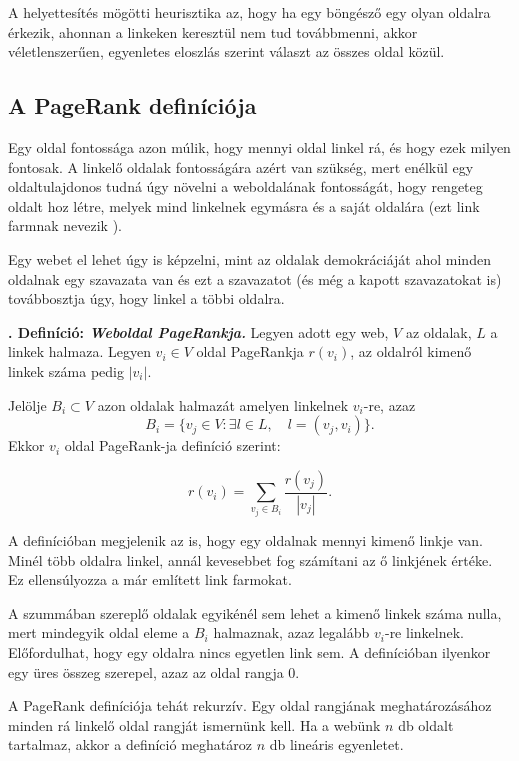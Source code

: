 \documentclass[12pt,a4paper]{article}
\newcounter{definicioszam}
\newenvironment{definicio}[1]
{{\medskip}\noindent \stepcounter{definicioszam}
{\bfseries{\thedefinicioszam. Definíció: \textit{#1.}}}}{\bigskip }
\begin{document}
\vspace{0.5 cm}

A helyettesítés mögötti heurisztika az, hogy ha egy böngésző egy olyan oldalra érkezik, ahonnan a linkeken keresztül nem tud továbbmenni, akkor véletlenszerűen, egyenletes eloszlás szerint választ az összes oldal közül.

\subsection{A PageRank definíciója}

Egy oldal fontossága azon múlik, hogy mennyi oldal linkel rá, és hogy ezek milyen fontosak. A linkelő oldalak fontosságára azért van szükség, mert enélkül egy oldaltulajdonos tudná úgy növelni a weboldalának fontosságát, hogy rengeteg oldalt hoz létre, melyek mind linkelnek egymásra és a saját oldalára (ezt link farmnak nevezik \cite{lang}).

Egy webet el lehet úgy is képzelni, mint az oldalak demokráciáját ahol minden oldalnak egy szavazata van és ezt a szavazatot (és még a kapott szavazatokat is) továbbosztja úgy, hogy linkel a többi oldalra.

\begin{definicio}{Weboldal PageRankja}
	Legyen adott egy web, $V$ az oldalak, $L$ a linkek halmaza.
	Legyen $v_i \in V$ oldal PageRankja $r(v_i)$, az oldalról kimenő linkek száma pedig $ |v_i| $. 
	
	Jelölje $B_i \subset V$ azon oldalak halmazát amelyen linkelnek $v_i$-re, azaz
	\[B_i = \{ v_j \in V: \exists l \in L, \quad l = (v_j,v_i) \} \text{.} \]
	Ekkor $v_i$ oldal PageRank-ja definíció szerint:
	
	\[ r(v_i) = \sum_{v_j \in B_i} \frac{r(v_j)}{ |v_j| } \text{.} \]
\end{definicio}

A definícióban megjelenik az is, hogy egy oldalnak mennyi kimenő linkje van. Minél több oldalra linkel, annál kevesebbet fog számítani az ő linkjének értéke. Ez ellensúlyozza a már említett link farmokat.

A szummában szereplő oldalak egyikénél sem lehet a kimenő linkek száma nulla, mert mindegyik oldal eleme a $B_i$ halmaznak, azaz legalább $v_i$-re linkelnek. Előfordulhat, hogy egy oldalra nincs egyetlen link sem. A definícióban ilyenkor egy üres összeg szerepel, azaz az oldal rangja 0.

A PageRank definíciója tehát rekurzív. Egy oldal rangjának meghatározásához minden rá linkelő oldal rangját ismernünk kell. Ha a webünk $n$ db oldalt tartalmaz, akkor a definíció meghatároz $n$ db lineáris egyenletet.
\end{document}
